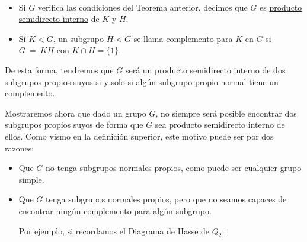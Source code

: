 \begin{definicion}\ 
    \begin{itemize}
    \item Si $G$ verifica las condiciones del Teorema anterior, decimos que $G$ es \underline{producto} \underline{semidirecto interno} de $K$ y $H$.
        \item Si $K < G$, un subgrupo $H<G$ se llama \underline{complemento para $K$ en $G$} si $G~=~KH$ con $K\cap H = \{1\}$.
    \end{itemize}
    De esta forma, tendremos que $G$ será un producto semidirecto interno de dos subgrupos propios suyos si y solo si algún subgrupo propio normal tiene un complemento.
\end{definicion}

\begin{ejemplo}
    Mostraremos ahora que dado un grupo $G$, no siempre será posible encontrar dos subgrupos propios suyos de forma que $G$ sea producto semidirecto interno de ellos. Como vismo en la definición superior, este motivo puede ser por dos razones:
    \begin{itemize}
        \item Que $G$ no tenga subgrupos normales propios, como puede ser cualquier grupo simple.
        \item Que $G$ tenga subgrupos normales propios, pero que no seamos capaces de encontrar ningún complemento para algún subgrupo.

            Por ejemplo, si recordamos el Diagrama de Hasse de $Q_2$:
            \begin{figure}[H]
                \centering
\end{figure}
\end{itemize}
\end{ejemplo}
